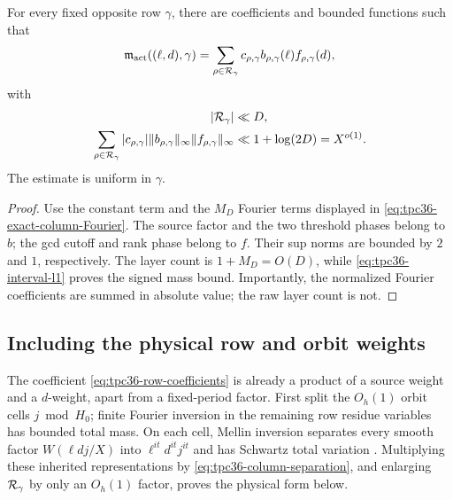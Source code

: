 \begin{theorem}
\label{thm:tpc36-fixed-column-separation}
For every fixed opposite row \(\gamma\), there are coefficients and
bounded functions such that
\begin{equation}
 \mathfrak m_{\rm act}((\ell,d),\gamma)
 =\sum_{\rho\in\mathcal R_\gamma}
 c_{\rho,\gamma}b_{\rho,\gamma}(\ell)
 f_{\rho,\gamma}(d),
 \label{eq:tpc36-column-separation}
\end{equation}
with
\begin{align}
 |\mathcal R_\gamma|&\ll D,
 \label{eq:tpc36-column-layer-count}\\
 \sum_{\rho\in\mathcal R_\gamma}|c_{\rho,\gamma}|
 \|b_{\rho,\gamma}\|_\infty
 \|f_{\rho,\gamma}\|_\infty
 &\ll1+\log(2D)=X^{o(1)}.
 \label{eq:tpc36-column-projective-cost}
\end{align}
The estimate is uniform in \(\gamma\).
\end{theorem}

\begin{proof}
Use the constant term and the \(M_D\) Fourier terms displayed in
\eqref{eq:tpc36-exact-column-Fourier}.  The source factor and the two
threshold phases belong to \(b\); the gcd cutoff and rank phase belong to
\(f\).  Their sup norms are bounded by \(2\) and \(1\), respectively.
The layer count is \(1+M_D=O(D)\), while
\eqref{eq:tpc36-interval-l1} proves the signed mass bound.  Importantly,
the normalized Fourier coefficients are summed in absolute value; the
raw layer count is not.
\end{proof}

\subsection{Including the physical row and orbit weights}

The coefficient \eqref{eq:tpc36-row-coefficients} is already a product of
a source weight and a \(d\)-weight, apart from a fixed-period factor.
First split the \(O_h(1)\) orbit cells \(j\bmod H_0\); finite Fourier
inversion in the remaining row residue variables has bounded total mass.
On each cell, Mellin inversion separates every smooth factor
\(W(\ell dj/X)\) into
\(\ell^{it}d^{it}j^{it}\) and has Schwartz total variation
\citep{WangTPC25}.  Multiplying these inherited representations by
\eqref{eq:tpc36-column-separation}, and enlarging \(\mathcal R_\gamma\) by only
an \(O_h(1)\) factor, proves the physical form below.

